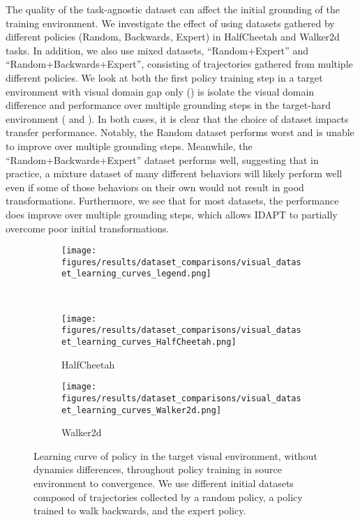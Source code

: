 The quality of the task-agnostic dataset can affect the initial grounding of the training environment.  We investigate the effect of using datasets gathered by different policies (Random, Backwards, Expert) in HalfCheetah and Walker2d tasks.  In addition, we also use mixed datasets, ``Random+Expert'' and ``Random+Backwards+Expert'', consisting of trajectories gathered from multiple different policies.  We look at both the first policy training step in a target environment with visual domain gap only () is isolate the visual domain difference and performance over multiple grounding steps in the target-hard environment ( and ).  In both cases, it is clear that the choice of dataset impacts transfer performance.  Notably, the Random dataset performs worst and is unable to improve over multiple grounding steps.  Meanwhile, the ``Random+Backwards+Expert'' dataset performs well, suggesting that in practice, a mixture dataset of many different behaviors will likely perform well even if some of those behaviors on their own would not result in good transformations.  Furthermore, we see that for most datasets, the performance does improve over multiple grounding steps, which allows IDAPT to partially overcome poor initial transformations.

\begin{figure}[ht]
    \centering
    \begin{subfigure}[t]{\linewidth}        
        \texttt{[image: figures/results/dataset\_comparisons/visual\_dataset\_learning\_curves\_legend.png]}
    \end{subfigure}
    \\
    \begin{subfigure}[t]{0.48\linewidth}
        \texttt{[image: figures/results/dataset\_comparisons/visual\_dataset\_learning\_curves\_HalfCheetah.png]}
        \caption{HalfCheetah}
    \end{subfigure}
    \begin{subfigure}[t]{0.48\linewidth}
        \texttt{[image: figures/results/dataset\_comparisons/visual\_dataset\_learning\_curves\_Walker2d.png]}
        \caption{Walker2d}
    \end{subfigure}
    \caption{
        Learning curve of policy in the target visual environment, without dynamics differences, throughout policy training in source environment to convergence.  We use different initial datasets composed of trajectories collected by a random policy, a policy trained to walk backwards, and the expert policy.  
    }
\label{fig:datasets_ablations}
\end{figure}


